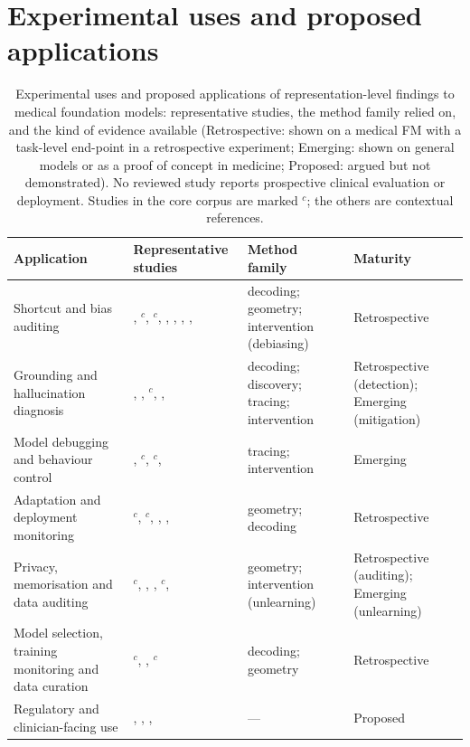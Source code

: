 \section{Experimental uses and proposed applications}
\label{sec:applications}

\begin{table}[!tb]
\centering\small
\caption{Experimental uses and proposed applications of representation-level findings to medical foundation
models: representative studies, the method family relied on, and the kind of evidence available
(Retrospective: shown on a medical FM with a task-level end-point in a retrospective experiment; Emerging:
shown on general models or as a proof of concept in medicine; Proposed: argued but not demonstrated).
No reviewed study reports prospective clinical evaluation or deployment. Studies in the core corpus are marked $^{c}$; the others are contextual references.}
\label{tab:applications}
\begin{tabular}{@{}L{3.6cm}L{5.4cm}L{3.4cm}L{2.2cm}@{}}
\toprule
Application & Representative studies & Method family & Maturity \\
\midrule
Shortcut and bias auditing & \cite{glocker2023algorithmic}, \cite{zheng2024demographic}$^{c}$, \cite{sourget2025fairness}$^{c}$, \cite{yang2024demographic}, \cite{zheng2025towards}, \cite{huang2025knowledgeguided}, \cite{pahde2025ensuring}, \cite{janizek2026visual} & decoding; geometry; intervention (debiasing) & Retrospective \\
Grounding and hallucination diagnosis & \cite{hardy2024rextrust}, \cite{yu2026realtime}, \cite{nooralahzadeh2026universal}$^{c}$, \cite{li2026suppressing}, \cite{phukan2024beyond} & decoding; discovery; tracing; intervention & Retrospective (detection); Emerging (mitigation) \\
Model debugging and behaviour control & \cite{abbasi2026layerspecific}, \cite{sadanandan2026mechanistically}$^{c}$, \cite{farina2026translating}$^{c}$, \cite{basu2026interpretability} & tracing; intervention & Emerging \\
Adaptation and deployment monitoring & \cite{dejong2025current}$^{c}$, \cite{donle2026featmap}$^{c}$, \cite{disalvo2026mars}, \cite{poceviciute2024outofdistribution}, \cite{das2026proton} & geometry; decoding & Retrospective \\
Privacy, memorisation and data auditing & \cite{tayebiarasteh2026crossmodal}$^{c}$, \cite{deo2026a}, \cite{hardan2025forgetmi}, \cite{zhang2026auditing}$^{c}$, \cite{xu2026a} & geometry; intervention (unlearning) & Retrospective (auditing); Emerging (unlearning) \\
Model selection, training monitoring and data curation & \cite{liang2026cheap}$^{c}$, \cite{chen2025revisiting}, \cite{zhang2026auditing}$^{c}$ & decoding; geometry & Retrospective \\
Regulatory and clinician-facing use & \cite{muralidharan2024a}, \cite{mehta2025evaluating}, \cite{warraich2024fda}, \cite{rosenbacke2024how} & --- & Proposed \\
\bottomrule
\end{tabular}
\end{table}


